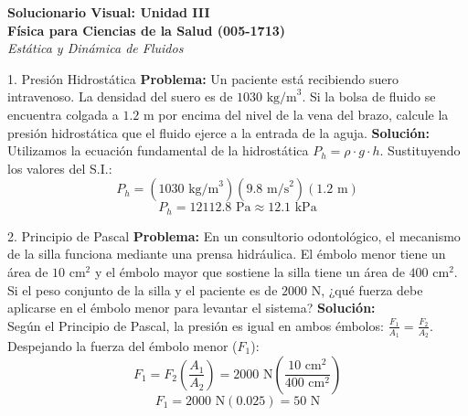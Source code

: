 \documentclass[12pt,letterpaper]{article}
\begin{document}
\begin{center}
    {\Huge \textbf{Solucionario Visual: Unidad III}}\\[0.3cm]
    {\Large \textbf{Física para Ciencias de la Salud (005-1713)}}\\[0.2cm]
    {\large \textit{Estática y Dinámica de Fluidos}}
\end{center}

\vspace{0.5cm}

\begin{infobox}{1. Presión Hidrostática}
    \textbf{Problema:} Un paciente está recibiendo suero intravenoso. La densidad del suero es de $1030 \text{ kg/m}^3$. Si la bolsa de fluido se encuentra colgada a $1.2 \text{ m}$ por encima del nivel de la vena del brazo, calcule la presión hidrostática que el fluido ejerce a la entrada de la aguja.
    \tcblower
    \textbf{Solución:}\\
    Utilizamos la ecuación fundamental de la hidrostática $P_h = \rho \cdot g \cdot h$. Sustituyendo los valores del S.I.:
    \[
    P_h = (1030 \text{ kg/m}^3)(9.8 \text{ m/s}^2)(1.2 \text{ m})
    \]
    \[
    P_h = 12112.8 \text{ Pa} \approx 12.1 \text{ kPa}
    \]
\end{infobox}

\vspace{0.3cm}
\begin{infobox}{2. Principio de Pascal}
    \textbf{Problema:} En un consultorio odontológico, el mecanismo de la silla funciona mediante una prensa hidráulica. El émbolo menor tiene un área de $10 \text{ cm}^2$ y el émbolo mayor que sostiene la silla tiene un área de $400 \text{ cm}^2$. Si el peso conjunto de la silla y el paciente es de $2000 \text{ N}$, ¿qué fuerza debe aplicarse en el émbolo menor para levantar el sistema?
    \tcblower
    \textbf{Solución:}\\
    Según el Principio de Pascal, la presión es igual en ambos émbolos: $\frac{F_1}{A_1} = \frac{F_2}{A_2}$. Despejando la fuerza del émbolo menor ($F_1$):
    \[
    F_1 = F_2 \left( \frac{A_1}{A_2} \right) = 2000 \text{ N} \left( \frac{10 \text{ cm}^2}{400 \text{ cm}^2} \right)
    \]
    \[
    F_1 = 2000 \text{ N} (0.025) = 50 \text{ N}
    \]
\end{infobox}
\end{document}
